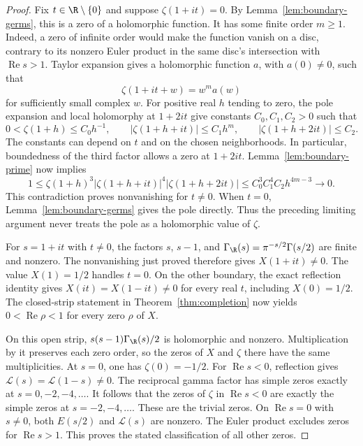 \begin{proof}
Fix $t\in\R\setminus\{0\}$ and suppose $\zeta(1+it)=0$.
By Lemma~\ref{lem:boundary-germs}, this is a zero of a holomorphic
function.  It has some finite order $m\geq1$.
Indeed, a zero of infinite order would make the function vanish on a
disc, contrary to its nonzero Euler product in the same disc's
intersection with $\operatorname{Re}s>1$.
Taylor expansion gives a holomorphic function $a$, with $a(0)\ne0$,
such that
\[
 \zeta(1+it+w)=w^m a(w)
\]
for sufficiently small complex $w$.
For positive real $h$ tending to zero, the pole expansion and local
holomorphy at $1+2it$ give constants $C_0,C_1,C_2>0$ such that
\[
 0<\zeta(1+h)\leq C_0h^{-1},\qquad
 |\zeta(1+h+it)|\leq C_1h^m,\qquad
 |\zeta(1+h+2it)|\leq C_2.
\]
The constants can depend on $t$ and on the chosen neighborhoods.
In particular, boundedness of the third factor allows a zero at $1+2it$.
Lemma~\ref{lem:boundary-prime} now implies
\[
 1\leq\zeta(1+h)^3|\zeta(1+h+it)|^4|\zeta(1+h+2it)|
 \leq C_0^3C_1^4C_2 h^{4m-3}\longrightarrow0.
\]
This contradiction proves nonvanishing for $t\ne0$.
When $t=0$, Lemma~\ref{lem:boundary-germs} gives the pole directly.
Thus the preceding limiting argument never treats the pole as a
holomorphic value of $\zeta$.

For $s=1+it$ with $t\ne0$, the factors $s$, $s-1$, and
$\Gamma_{\R}(s)=\pi^{-s/2}\Gamma(s/2)$ are finite and nonzero.
The nonvanishing just proved therefore gives $X(1+it)\ne0$.
The value $X(1)=1/2$ handles $t=0$.
On the other boundary, the exact reflection identity gives
$X(it)=X(1-it)\ne0$ for every real $t$, including $X(0)=1/2$.
The closed-strip statement in Theorem~\ref{thm:completion} now yields
$0<\operatorname{Re}\rho<1$ for every zero $\rho$ of $X$.

On this open strip, $s(s-1)\Gamma_{\R}(s)/2$ is holomorphic and
nonzero.  Multiplication by it preserves each zero order, so the zeros
of $X$ and $\zeta$ there have the same multiplicities.
At $s=0$, one has $\zeta(0)=-1/2$.
For $\operatorname{Re}s<0$, reflection gives
$\mathcal L(s)=\mathcal L(1-s)\ne0$.
The reciprocal gamma factor has simple zeros exactly at
$s=0,-2,-4,\ldots$.
It follows that the zeros of $\zeta$ in $\operatorname{Re}s<0$ are
exactly the simple zeros at $s=-2,-4,\ldots$.
These are the trivial zeros.
On $\operatorname{Re}s=0$ with $s\ne0$, both $E(s/2)$ and
$\mathcal L(s)$ are nonzero.  The Euler product excludes zeros for
$\operatorname{Re}s>1$.
This proves the stated classification of all other zeros.


\end{proof}
